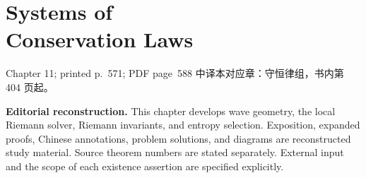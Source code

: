 \chapter[Systems of Conservation Laws]{Systems of\\Conservation Laws}
\label{chap:systems-of-conservation-laws}

\PDESource
  {Chapter 11; printed p.~571; PDF page~588}
  {中译本对应章：守恒律组，书内第 404 页起。}

\noindent\textbf{Editorial reconstruction.}
This chapter develops wave geometry, the local Riemann solver, Riemann
invariants, and entropy selection. Exposition, expanded proofs, Chinese
annotations, problem solutions, and diagrams are reconstructed study
material. Source theorem numbers are stated separately. External input
and the scope of each existence assertion are specified explicitly.







